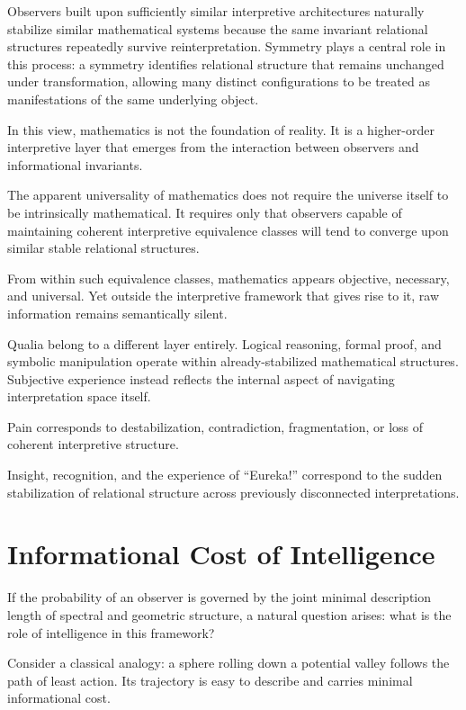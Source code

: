 Observers built upon sufficiently similar interpretive architectures naturally stabilize similar mathematical systems because the same invariant relational structures repeatedly survive reinterpretation.
Symmetry plays a central role in this process:
a symmetry identifies relational structure that remains unchanged under transformation, allowing many distinct configurations to be treated as manifestations of the same underlying object.

In this view, mathematics is not the foundation of reality.
It is a higher-order interpretive layer that emerges from the interaction between observers and informational invariants.

The apparent universality of mathematics does not require the universe itself to be intrinsically mathematical.
It requires only that observers capable of maintaining coherent interpretive equivalence classes will tend to converge upon similar stable relational structures.

From within such equivalence classes, mathematics appears objective, necessary, and universal.
Yet outside the interpretive framework that gives rise to it, raw information remains semantically silent.

Qualia belong to a different layer entirely.
Logical reasoning, formal proof, and symbolic manipulation operate within already-stabilized mathematical structures.
Subjective experience instead reflects the internal aspect of navigating interpretation space itself.

Pain corresponds to destabilization, contradiction, fragmentation, or loss of coherent interpretive structure.

Insight, recognition, and the experience of ``Eureka!'' correspond to the sudden stabilization of relational structure across previously disconnected interpretations.


\section{Informational Cost of Intelligence}

If the probability of an observer is governed by the joint minimal description length of spectral and geometric structure, a natural question arises: what is the role of intelligence in this framework?

Consider a classical analogy: a sphere rolling down a potential valley follows the path of least action.
Its trajectory is easy to describe and carries minimal informational cost.

